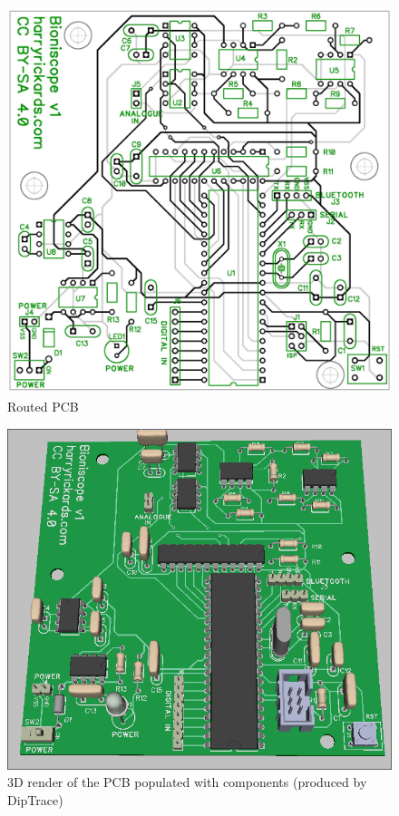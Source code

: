 

\begin{figure}[H]
  \includegraphics[width=\linewidth]{img/pcb/pcbBig.png}
  \caption[PCB (traces)]{Routed PCB}
  \label{fig:largePCBDiagram}
\end{figure}

\begin{figure}[H]
  \includegraphics[width=\linewidth]{img/pcb/pcb3D.png}
  \caption[PCB (3D render)]{3D render of the PCB populated with components (produced by DipTrace)}
  \label{fig:pcb3DRender}
\end{figure}

